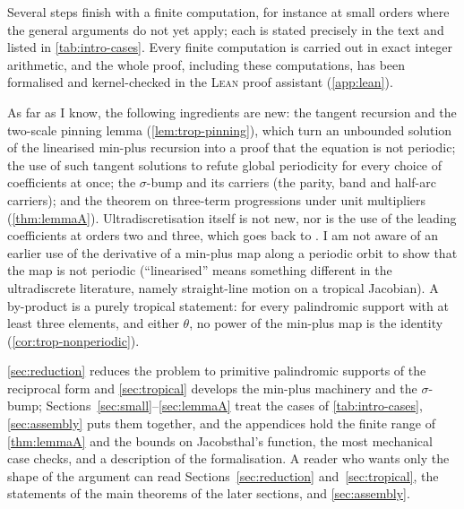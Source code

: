 Several steps finish with a finite computation, for instance at small
orders where the general arguments do not yet apply; each is stated
precisely in the text and listed in \autoref{tab:intro-cases}. Every finite
computation is carried out in exact integer arithmetic, and the whole proof,
including these computations, has been formalised and kernel-checked in the
\textsc{Lean} proof assistant (\autoref{app:lean}).

As far as I know, the following ingredients are new: the tangent recursion
and the two-scale pinning lemma (\autoref{lem:trop-pinning}), which turn an
unbounded solution of the linearised min-plus recursion into a proof that the
equation is not periodic; the use of such tangent solutions to refute global
periodicity for every choice of coefficients at once; the $\sigma$-bump and
its carriers (the parity, band and half-arc carriers); and the theorem on
three-term progressions under unit multipliers (\autoref{thm:lemmaA}).
Ultradiscretisation itself is not new, nor is the use of the leading
coefficients at orders two and three, which goes back to
\citet{CsornyeiLaczkovich2001}. I am not aware of an earlier use of the derivative of a min-plus map along a
periodic orbit to show that the map is not periodic (``linearised'' means
something different in the ultradiscrete literature, namely straight-line
motion on a tropical Jacobian). A by-product is a purely
tropical statement: for every palindromic support with at least three
elements, and either $\theta$, no power of the min-plus map is the identity
(\autoref{cor:trop-nonperiodic}).

\autoref{sec:reduction} reduces the problem to primitive palindromic
supports of the reciprocal form and \autoref{sec:tropical} develops the
min-plus machinery and the $\sigma$-bump; Sections~\ref{sec:small}--\ref{sec:lemmaA}
treat the cases of \autoref{tab:intro-cases}, \autoref{sec:assembly} puts
them together, and the appendices hold the finite range of
\autoref{thm:lemmaA} and the bounds on Jacobsthal's function, the most
mechanical case checks, and a description of the formalisation. A reader who wants only the shape of the argument can
read Sections~\ref{sec:reduction} and~\ref{sec:tropical}, the statements of
the main theorems of the later sections, and \autoref{sec:assembly}.

